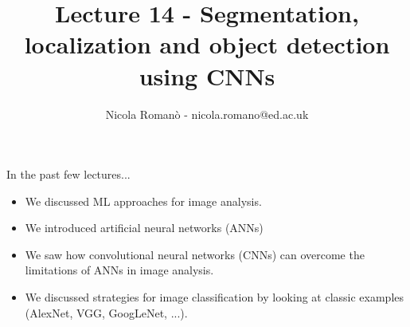 \documentclass[9pt, aspectratio=169]{beamer}
\author{Nicola Roman\`o - nicola.romano@ed.ac.uk}
\title{Lecture 14 - Segmentation, localization and object detection using CNNs}
\date{}
\begin{document}

\begin{frame}
    \titlepage
\end{frame}

\begin{frame}
    {In the past few lectures...}
    \begin{itemize}
        \item We discussed ML approaches for image analysis.
        \item We introduced artificial neural networks (ANNs)
        \item We saw how convolutional neural networks (CNNs) can overcome the limitations of ANNs in image analysis.
        \item We discussed strategies for image classification by looking at classic examples (AlexNet, VGG, GoogLeNet, ...).
    \end{itemize}
\end{frame}
\end{document}

